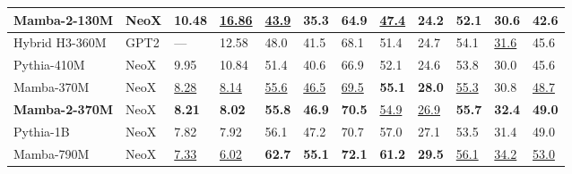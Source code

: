 \documentclass{article}
\begin{document}
\begin{table}[ht]
{\begin{tabular}{@{}llllllllllll@{}}
      \textbf{Mamba-2-130M} & NeoX        & \textbf{10.48}             & \underline{16.86}          & \underline{43.9}          & \textbf{35.3}              & \textbf{64.9}             & \underline{47.4}          & \textbf{24.2}                         & \textbf{52.1}                           & \textbf{30.6}                           & \textbf{42.6} \\
      \midrule
      Hybrid H3-360M        & GPT2        & ---                        & 12.58                      & 48.0                      & 41.5                       & 68.1                      & 51.4                      & 24.7                                  & 54.1                                    & \underline{31.6}                        & 45.6 \\
      Pythia-410M           & NeoX        & 9.95                       & 10.84                      & 51.4                      & 40.6                       & 66.9                      & 52.1                      & 24.6                                  & 53.8                                    & 30.0                                    & 45.6 \\
      Mamba-370M            & NeoX        & \underline{8.28}           & \underline{8.14}           & \underline{55.6}          & \underline{46.5}           & \underline{69.5}          & \textbf{55.1}             & \textbf{28.0}                         & \underline{55.3}                        & 30.8                                    & \underline{48.7} \\
      \textbf{Mamba-2-370M} & NeoX        & \textbf{8.21}              & \textbf{8.02}              & \textbf{55.8}             & \textbf{46.9}              & \textbf{70.5}             & \underline{54.9}          & \underline{26.9}                      & \textbf{55.7}                           & \textbf{32.4}                           & \textbf{49.0} \\
      \midrule
      Pythia-1B             & NeoX        & 7.82                       & 7.92                       & 56.1                      & 47.2                       & 70.7                      & 57.0                      & 27.1                                  & 53.5                                    & 31.4                                    & 49.0 \\
      Mamba-790M            & NeoX        & \underline{7.33}           & \underline{6.02}           & \textbf{62.7}             & \textbf{55.1}              & \textbf{72.1}             & \textbf{61.2}             & \textbf{29.5}                         & \underline{56.1}                        & \underline{34.2}                        & \underline{53.0} \\

\end{tabular}}
\end{table}
\end{document}
